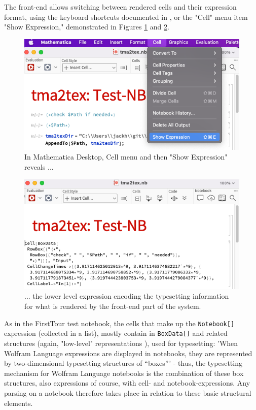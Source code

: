 The front-end allows switching between rendered cells and their expression format, using the keyboard shortcuts documented in \cite{noauthor_cell_nodate}, or the "Cell" menu item "Show Expression," demonstrated in Figures \ref{fig:MM-show-expression} and \ref{fig:MM-show-expression-1}.

\begin{figure}[h]
    \centering
    \includegraphics[scale=0.5]{images/introduction/MM-show-expression.png}
    \caption{In Mathematica Desktop, Cell menu and then "Show Expression" reveals ...}
    \label{fig:MM-show-expression}
\end{figure}

\begin{figure}[h]
    \centering
    \includegraphics[scale=0.5]{images/introduction/MM-show-expression-1.png}
    \caption{... the lower level expression encoding the typesetting information for what is rendered by the front-end part of the system.}
    \label{fig:MM-show-expression-1}
\end{figure}

As in the FirstTour test notebook, the cells that make up the \lstinline+Notebook[]+ expression (collected in a list), mostly contain in \lstinline+BoxData[]+ and related structures (again, "low-level" representations \cite{noauthor_boxdatawolfram_nodate}), used for typesetting: 'When Wolfram Language expressions are displayed in notebooks, they are represented by two-dimensional typesetting structures of “boxes”' \cite{noauthor_find_nodate} - thus, the typesetting mechanism for Wolfram Language notebooks is the combination of these box structures, also expressions of course, with cell- and notebook-expressions. Any parsing on a notebook therefore takes place in relation to these basic structural elements.

